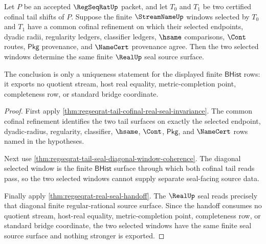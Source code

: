 \begin{theorem}
\label{thm:regseqrat-cofinal-tail-seal-selected-window-uniqueness}
Let $P$ be an accepted $\RegSeqRatUp$ packet, and let $T_0$ and $T_1$ be two
certified cofinal tail shifts of $P$. Suppose the finite $\StreamNameUp$
windows selected by $T_0$ and $T_1$ have a common cofinal refinement on which
their selected endpoints, dyadic radii, regularity ledgers, classifier
ledgers, $\hsame$ comparisons, $\Cont$ routes, $\mathsf{Pkg}$ provenance, and
$\NameCert$ provenance agree. Then the two selected windows determine the
same finite $\RealUp$ seal source surface.

The conclusion is only a uniqueness statement for the displayed finite
$\mathsf{BHist}$ rows: it exports no quotient stream, host real equality,
metric-completion point, completeness row, or standard bridge coordinate.
\end{theorem}
\begin{proof}
First apply
\autoref{thm:regseqrat-tail-cofinal-real-seal-invariance}. The common cofinal
refinement identifies the two tail surfaces on exactly the selected endpoint,
dyadic-radius, regularity, classifier, $\hsame$, $\Cont$, $\mathsf{Pkg}$, and
$\NameCert$ rows named in the hypotheses.

Next use \autoref{thm:regseqrat-tail-seal-diagonal-window-coherence}. The
diagonal selected window is the finite $\mathsf{BHist}$ surface through which
both cofinal tail reads pass, so the two selected windows cannot supply
separate seal-facing source data.

Finally apply \autoref{thm:regseqrat-real-seal-handoff}. The $\RealUp$ seal
reads precisely that diagonal finite regular-rational source surface. Since
the handoff consumes no quotient stream, host-real equality,
metric-completion point, completeness row, or standard bridge coordinate, the
two selected windows have the same finite seal source surface and nothing
stronger is exported.
\end{proof}

